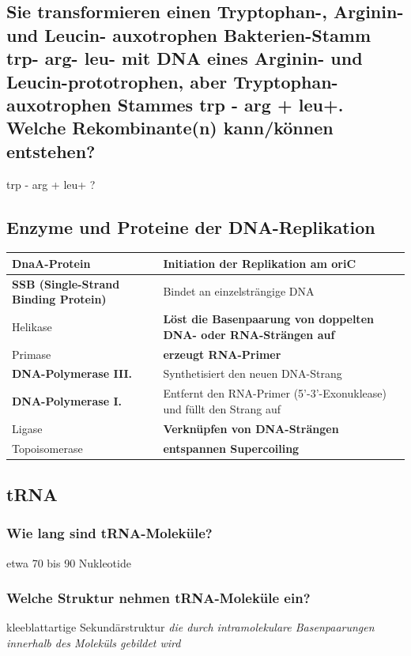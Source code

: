 \documentclass{article}
\begin{document}
\subsection*{Sie transformieren einen Tryptophan-, Arginin- und Leucin- auxotrophen Bakterien-Stamm trp- arg- leu- mit DNA eines Arginin- und Leucin-prototrophen, aber Tryptophan-auxotrophen Stammes trp - arg + leu+. 
Welche Rekombinante(n) kann/können entstehen?}
trp - arg + leu+ ? 

\subsection*{Enzyme und Proteine der DNA-Replikation}
\begin{table}[H]
    \centering 
    \begin{tabular}{|p{4cm}|p{11cm}|}
    \hline
    \textbf{DnaA-Protein} &  Initiation der Replikation am oriC\\\hline 
    \textbf{SSB (Single-Strand Binding Protein)} & Bindet an einzelsträngige DNA  \\\hline
    Helikase &  \textbf{Löst die Basenpaarung von doppelten DNA- oder RNA-Strängen auf} \\\hline
    Primase &   \textbf{erzeugt RNA-Primer}\\\hline
    \textbf{DNA-Polymerase III.} & Synthetisiert den neuen DNA-Strang \\\hline
    \textbf{DNA-Polymerase I.} & Entfernt den RNA-Primer (5'-3'-Exonuklease) und füllt den Strang auf \\\hline
    Ligase &  \textbf{Verknüpfen von DNA-Strängen}\\\hline
    Topoisomerase & \textbf{entspannen Supercoiling} \\\hline
\end{tabular}
\end{table}
\subsection*{tRNA}
\subsubsection*{Wie lang sind tRNA-Moleküle?}
etwa 70 bis 90 Nukleotide
\subsubsection*{Welche Struktur nehmen tRNA-Moleküle ein?}
kleeblattartige Sekundärstruktur \textit{die durch intramolekulare Basenpaarungen innerhalb des Moleküls gebildet wird}
\end{document}
